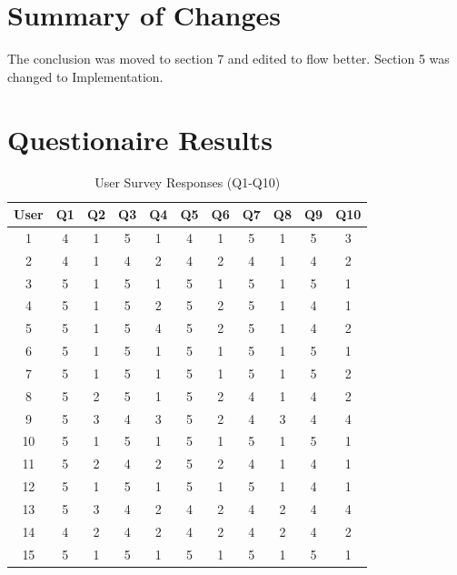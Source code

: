 \documentclass[12pt,nonacm,acmlarge,titlepage,screen]{acmart}
\begin{document}
\section{Summary of Changes}

The conclusion was moved to section 7 and edited to flow better. Section 5 was changed to Implementation.

\clearpage

\section{Questionaire Results}

\begin{table}[htbp]
    \centering
    \small
    \renewcommand{\arraystretch}{1.3}
    
    \begin{tabular}{| c | *{10}{c|} }
        \hline
        \textbf{User} & \textbf{Q1} & \textbf{Q2} & \textbf{Q3} & \textbf{Q4} & \textbf{Q5} & \textbf{Q6} & \textbf{Q7} & \textbf{Q8} & \textbf{Q9} & \textbf{Q10} \\
        \hline
        1  & 4 & 1 & 5 & 1 & 4 & 1 & 5 & 1 & 5 & 3 \\ \hline
        2  & 4 & 1 & 4 & 2 & 4 & 2 & 4 & 1 & 4 & 2 \\ \hline
        3  & 5 & 1 & 5 & 1 & 5 & 1 & 5 & 1 & 5 & 1 \\ \hline
        4  & 5 & 1 & 5 & 2 & 5 & 2 & 5 & 1 & 4 & 1 \\ \hline
        5  & 5 & 1 & 5 & 4 & 5 & 2 & 5 & 1 & 4 & 2 \\ \hline
        6  & 5 & 1 & 5 & 1 & 5 & 1 & 5 & 1 & 5 & 1 \\ \hline
        7  & 5 & 1 & 5 & 1 & 5 & 1 & 5 & 1 & 5 & 2 \\ \hline
        8  & 5 & 2 & 5 & 1 & 5 & 2 & 4 & 1 & 4 & 2 \\ \hline
        9  & 5 & 3 & 4 & 3 & 5 & 2 & 4 & 3 & 4 & 4 \\ \hline
        10 & 5 & 1 & 5 & 1 & 5 & 1 & 5 & 1 & 5 & 1 \\ \hline
        11 & 5 & 2 & 4 & 2 & 5 & 2 & 4 & 1 & 4 & 1 \\ \hline
        12 & 5 & 1 & 5 & 1 & 5 & 1 & 5 & 1 & 4 & 1 \\ \hline
        13 & 5 & 3 & 4 & 2 & 4 & 2 & 4 & 2 & 4 & 4 \\ \hline
        14 & 4 & 2 & 4 & 2 & 4 & 2 & 4 & 2 & 4 & 2 \\ \hline
        15 & 5 & 1 & 5 & 1 & 5 & 1 & 5 & 1 & 5 & 1 \\ \hline
    \end{tabular}
    \caption{User Survey Responses (Q1-Q10)}
    \label{tab:survey_data}
\end{table}
\end{document}
